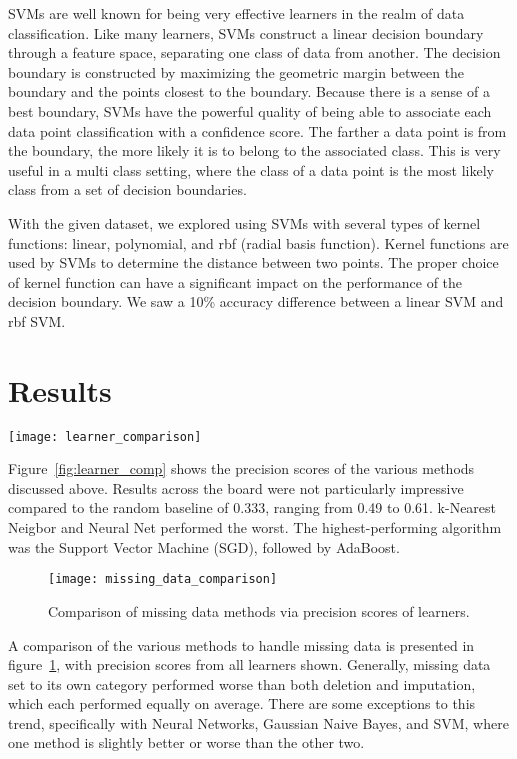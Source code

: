 \documentclass[conference]{IEEEtran}
\begin{document}
SVMs are well known for being very effective learners in the realm of data classification. Like many learners, SVMs construct a linear decision boundary through a feature space, separating one class of data from another. The decision boundary is constructed by maximizing the geometric margin between the boundary and the points closest to the boundary. Because there is a sense of a best boundary, SVMs have the powerful quality of being able to associate each data point classification with a confidence score. The farther a data point is from the boundary, the more likely it is to belong to the associated class. This is very useful in a multi class setting, where the class of a data point is the most likely class from a set of decision boundaries.

With the given dataset, we explored using SVMs with several types of kernel functions: linear, polynomial, and rbf (radial basis function). Kernel functions are used by SVMs to determine the distance between two points. The proper choice of kernel function can have a significant impact on the performance of the decision boundary. We saw a 10\% accuracy difference between a linear SVM and rbf SVM.

\section{Results}

\begin{figure*}[htpb]
	\centering
	\texttt{[image: learner\_comparison]}
	\caption{Comparison of precision scores of learners on dataset with missing data deleted and no oversampling performed.}
	\label{fig:learner_comp}
\end{figure*}

Figure~\ref{fig:learner_comp} shows the precision scores of the various methods discussed above. Results across the board were not particularly impressive compared to the random baseline of 0.333, ranging from 0.49 to 0.61. k-Nearest Neigbor and Neural Net performed the worst. The highest-performing algorithm was the Support Vector Machine (SGD), followed by AdaBoost.

\begin{figure}[htpb]
	\centering
	\texttt{[image: missing\_data\_comparison]}
	\caption{Comparison of missing data methods via precision scores of learners.}
	\label{fig:missing_data_comp}
\end{figure}

A comparison of the various methods to handle missing data is presented in figure~\ref{fig:missing_data_comp}, with precision scores from all learners shown. Generally, missing data set to its own category performed worse than both deletion and imputation, which each performed equally on average. There are some exceptions to this trend, specifically with Neural Networks, Gaussian Naive Bayes, and SVM, where one method is slightly better or worse than the other two.
\end{document}
